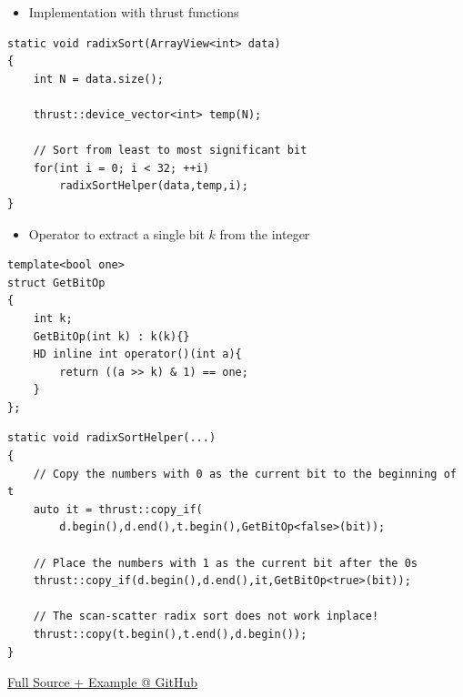 \documentclass[aspectratio=169]{beamer}
\begin{document}
\begin{frame}[fragile]
\begin{itemize}
	\item Implementation with thrust functions
\end{itemize}
\begin{lstlisting}
static void radixSort(ArrayView<int> data)
{
	int N = data.size();
	
	thrust::device_vector<int> temp(N);

	// Sort from least to most significant bit
	for(int i = 0; i < 32; ++i)
		radixSortHelper(data,temp,i);
}

\end{lstlisting}
\end{frame}


\begin{frame}[fragile]
\begin{itemize}
	\item Operator to extract a single bit $k$ from the integer
\end{itemize}
\begin{lstlisting}
template<bool one>
struct GetBitOp
{
	int k;
	GetBitOp(int k) : k(k){}
	HD inline int operator()(int a){
		return ((a >> k) & 1) == one;
	}
};
\end{lstlisting}
\end{frame}

\begin{frame}[fragile]

\begin{lstlisting}
static void radixSortHelper(...)
{
	// Copy the numbers with 0 as the current bit to the beginning of t
	auto it = thrust::copy_if(
		d.begin(),d.end(),t.begin(),GetBitOp<false>(bit));
	
	// Place the numbers with 1 as the current bit after the 0s
	thrust::copy_if(d.begin(),d.end(),it,GetBitOp<true>(bit));
	
	// The scan-scatter radix sort does not work inplace!
	thrust::copy(t.begin(),t.end(),d.begin());
}
\end{lstlisting}

\href{https://github.com/darglein/saiga/blob/master/samples/cuda/radixSort/main.cu}{Full Source + Example @ GitHub}
\end{frame}
\end{document}
